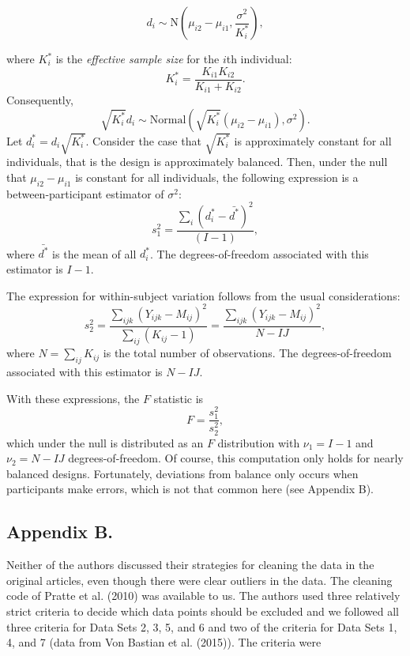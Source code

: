 \documentclass[american,man]{apa6}
\newcounter{author}
\begin{document}
\begin{equation}\label{diffModel}
d_i \sim \mbox{N}\left(\mu_{i2}-\mu_{i1},\frac{\sigma^2}{K^*_i}\right),
\end{equation}

where \(K^*_i\) is the \emph{effective sample size} for the \(i\)th
individual: \[
K^*_i=\frac{K_{i1}K_{i2}}{K_{i1}+K_{i2}}.
\] Consequently, \[
\sqrt{K^*_i} d_i \sim \mbox{Normal}(\sqrt{K^*_i}(\mu_{i2}-\mu_{i1}),\sigma^2).
\] Let \(d^*_i=d_i\sqrt{K^*_i}\). Consider the case that
\(\sqrt{K^*_i}\) is approximately constant for all individuals, that is
the design is approximately balanced. Then, under the null that
\(\mu_{i2}-\mu_{i1}\) is constant for all individuals, the following
expression is a between-participant estimator of \(\sigma^2\): \[
s^2_1 =\frac{\sum_i(d^*_i-\bar{d^*})^2}{(I-1)},
\] where \(\bar{d^*}\) is the mean of all \(d^*_i\). The
degrees-of-freedom associated with this estimator is \(I-1\).

The expression for within-subject variation follows from the usual
considerations: \[
s^2_2 = \frac{\sum_{ijk} (Y_{ijk}-M_{ij})^2}{\sum_{ij}(K_{ij}-1)}=\frac{\sum_{ijk} (Y_{ijk}-M_{ij})^2}{N-IJ},
\] where \(N=\sum_{ij}K_{ij}\) is the total number of observations. The
degrees-of-freedom associated with this estimator is \(N-IJ\).

With these expressions, the \(F\) statistic is \[
F = \frac{s^2_1}{s^2_2},
\] which under the null is distributed as an \(F\) distribution with
\(\nu_1=I-1\) and \(\nu_2=N-IJ\) degrees-of-freedom. Of course, this
computation only holds for nearly balanced designs. Fortunately,
deviations from balance only occurs when participants make errors, which
is not that common here (see Appendix B).

\subsection{Appendix B.}\label{appendix-b.}

Neither of the authors discussed their strategies for cleaning the data
in the original articles, even though there were clear outliers in the
data. The cleaning code of Pratte et al. (2010) was available to us. The
authors used three relatively strict criteria to decide which data
points should be excluded and we followed all three criteria for Data
Sets 2, 3, 5, and 6 and two of the criteria for Data Sets 1, 4, and 7
(data from Von Bastian et al. (2015)). The criteria were
\end{document}
